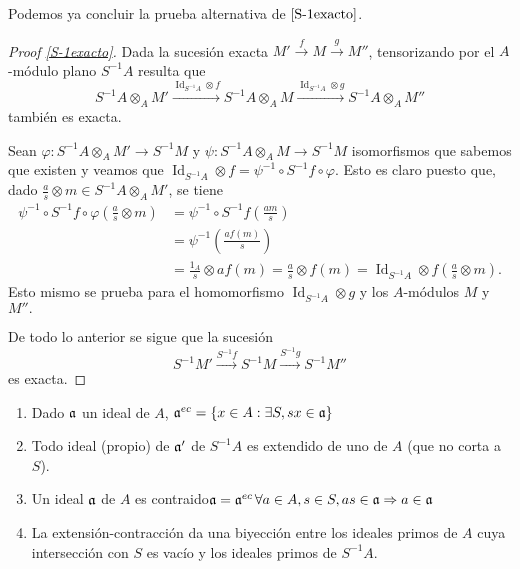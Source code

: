 \documentclass[../main.tex]{subfiles}
\begin{document}
	Podemos ya concluir la prueba alternativa de $\ref{S-1exacto}$.
	\begin{proof}[Proof \ref{S-1exacto}]
		Dada la sucesión exacta $M'\overset{f}{\longrightarrow}M\overset{g}{\longrightarrow}M''$, tensorizando por el $A$-módulo plano $S^{-1}A$ resulta que
		$$S^{-1}A\otimes_AM'\overset{\operatorname{Id}_{S^{-1}A}\otimes f}{\longrightarrow}S^{-1}A\otimes_AM\overset{\operatorname{Id}_{S^{-1}A}\otimes g}{\longrightarrow}S^{-1}A\otimes_AM''$$
		también es exacta.

		Sean $\varphi:S^{-1}A\otimes_AM'\longrightarrow S^{-1}M$ y $\psi:S^{-1}A\otimes_AM\longrightarrow S^{-1}M$ isomorfismos que sabemos que existen y veamos que $\operatorname{Id}_{S^{-1}A}\otimes f=\psi^{-1}\circ S^{-1}f\circ \varphi.$ Esto es claro puesto que, dado $\frac{a}{s}\otimes m\in S^{-1}A\otimes_A M'$, se tiene
		\begin{align*}
		\psi^{-1}\circ S^{-1}f\circ \varphi\left(\frac{a}{s}\otimes m\right)&=\psi^{-1}\circ S^{-1}f\left(\frac{am}{s}\right)\\
		&=\psi^{-1}\left(\frac{af(m)}{s}\right)\\
		&=\frac{1_A}{s}\otimes af(m)=\frac{a}{s}\otimes f(m)=\operatorname{Id}_{S^{-1}A}\otimes f\left(\frac{a}{s}\otimes m\right).
		\end{align*}
		Esto mismo se prueba para el homomorfismo $\operatorname{Id}_{S^{-1}A}\otimes g$ y los $A$-módulos $M$ y $M''.$

		De todo lo anterior se sigue que la sucesión
		$$S^{-1}M'\overset{S^{-1}f}{\longrightarrow}S^{-1}M\overset{S^{-1}g}{\longrightarrow}S^{-1}M''$$
		es exacta.
	\end{proof}
	\begin{proposition}
\begin{enumerate}
    \item Dado $\mathfrak{a}$ un ideal de $A$, $\mathfrak{a}^{ec}=\{x\in A:\exists S, sx\in\mathfrak{a}\}$
    \item Todo ideal (propio) de $\mathfrak{a}'$ de $S^{-1}A$ es extendido de uno de $A$ (que no corta a $S$).
    \item Un ideal $\mathfrak{a}$ de $A$ es contraido\iff $\mathfrak{a}=\mathfrak{a}^{ec}$\iff $\forall a\in A, s\in S, as\in\mathfrak{a}\Rightarrow a\in\mathfrak{a}$
    \item La extensión-contracción da una biyección entre los ideales primos de $A$ cuya intersección con $S$ es vacío y los ideales primos de $S^{-1}A$.
\end{enumerate}
\end{proposition}
\end{document}

